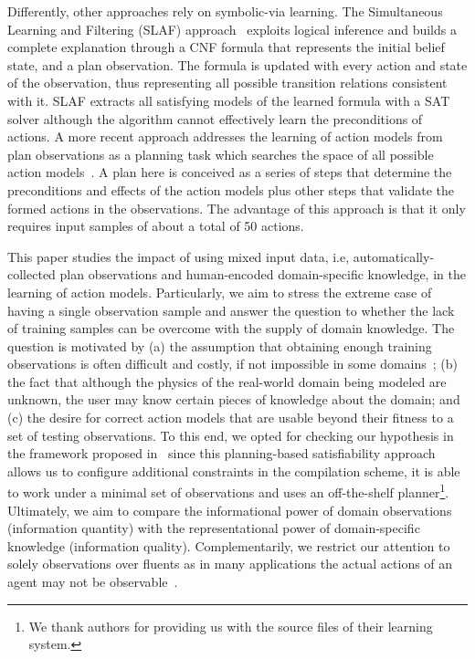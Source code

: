 \documentclass{article}
\newcommand{\SLAF}{{\small {\sffamily SLAF}}\xspace}
\begin{document}
Differently, other approaches rely on symbolic-via learning. The Simultaneous Learning and Filtering (\SLAF) approach~\cite{AmirC08} exploits logical inference and builds a complete explanation through a CNF formula that represents the initial belief state, and a plan observation. The formula is updated with every action and state of the observation, thus representing all possible transition relations consistent with it. \SLAF extracts all satisfying models of the learned formula with a SAT solver although the algorithm cannot effectively learn the preconditions of actions. A more recent approach addresses the learning of action models from plan observations as a planning task which searches the space of all possible action models~\cite{aineto2018learning}. A plan here is conceived as a series of steps that determine the preconditions and effects of the action models plus other steps that validate the formed actions in the observations. The advantage of this approach is that it only requires input samples of about a total of 50 actions.

This paper studies the impact of using mixed input data, i.e, automatically-collected plan observations and human-encoded domain-specific knowledge, in the learning of action models. Particularly, we aim to stress the extreme case of having a single observation sample and answer the question to whether the lack of training samples can be overcome with the supply of domain knowledge. The question is motivated by (a) the assumption that obtaining enough training observations is often difficult and costly, if not impossible in some domains~\cite{Zhuo15}; (b) the fact that although the physics of the real-world domain being modeled are unknown, the user may know certain pieces of knowledge about the domain; and (c) the desire for correct action models that are usable beyond their fitness to a set of testing observations. To this end, we opted for checking our hypothesis in the framework proposed in~\cite{aineto2018learning} since this planning-based satisfiability approach allows us to configure additional constraints in the compilation scheme, it is able to work under a minimal set of observations and uses an off-the-shelf planner\footnote{We thank authors for providing us with the source files of their learning system.}. Ultimately, we aim to compare the informational power of domain observations (information quantity) with the representational power of domain-specific knowledge (information quality). Complementarily, we restrict our attention to solely observations over fluents as in many applications the actual actions of an agent may not be observable~\cite{SohrabiRU16}.
\end{document}

